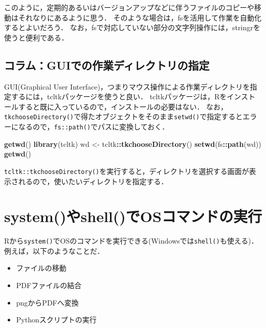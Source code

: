 \documentclass[
]{article}
\newenvironment{Shaded}{\begin{snugshade}}{\end{snugshade}}
\newcommand{\FunctionTok}[1]{\textcolor[rgb]{0.13,0.29,0.53}{\textbf{#1}}}
\newcommand{\NormalTok}[1]{#1}
\newcommand{\OtherTok}[1]{\textcolor[rgb]{0.56,0.35,0.01}{#1}}
\newcommand{\SpecialCharTok}[1]{\textcolor[rgb]{0.81,0.36,0.00}{\textbf{#1}}}
\providecommand{\tightlist}{%
  \setlength{\itemsep}{0pt}\setlength{\parskip}{0pt}}
\begin{document}
このように，定期的あるいはバージョンアップなどに伴うファイルのコピーや移動はそれなりにあるように思う．
そのような場合は，fsを活用して作業を自動化するとよいだろう．
なお，fsで対応していない部分の文字列操作には，stringrを使うと便利である．

\hypertarget{ux30b3ux30e9ux30e0guiux3067ux306eux4f5cux696dux30c7ux30a3ux30ecux30afux30c8ux30eaux306eux6307ux5b9a}{%
\subsection{コラム：GUIでの作業ディレクトリの指定}\label{ux30b3ux30e9ux30e0guiux3067ux306eux4f5cux696dux30c7ux30a3ux30ecux30afux30c8ux30eaux306eux6307ux5b9a}}

GUI(Graphical User Interface)，つまりマウス操作による作業ディレクトリを指定するには，tcltkパッケージを使うと良い．
tcltkパッケージは，Rをインストールすると既に入っているので，インストールの必要はない．
なお，\texttt{tkchooseDirectory()}で得たオブジェクトをそのまま\texttt{setwd()}で指定するとエラーになるので，\texttt{fs::path()}でパスに変換しておく．

\begin{Shaded}
\begin{Highlighting}[]
\FunctionTok{getwd}\NormalTok{()}
\FunctionTok{library}\NormalTok{(tcltk)}
\NormalTok{wd }\OtherTok{\textless{}{-}}\NormalTok{ tcltk}\SpecialCharTok{::}\FunctionTok{tkchooseDirectory}\NormalTok{()}
\FunctionTok{setwd}\NormalTok{(fs}\SpecialCharTok{::}\FunctionTok{path}\NormalTok{(wd))}
\FunctionTok{getwd}\NormalTok{()}
\end{Highlighting}
\end{Shaded}

\texttt{tcltk::tkchooseDirectory()}を実行すると，ディレクトリを選択する画面が表示されるので，使いたいディレクトリを指定する．

\hypertarget{shell}{%
\section{system()やshell()でOSコマンドの実行}\label{shell}}

Rから\texttt{system()}でOSのコマンドを実行できる(Windowsでは\texttt{shell()}も使える)．
例えば，以下のようなことだ．

\begin{itemize}
\tightlist
\item
  ファイルの移動\\
\item
  PDFファイルの結合\\
\item
  pngからPDFへ変換\\
\item
  Pythonスクリプトの実行
\end{itemize}
\end{document}
